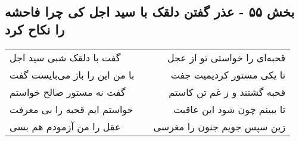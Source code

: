 \begin{center}
\section*{بخش ۵۵ - عذر گفتن دلقک با سید اجل کی چرا  فاحشه را نکاح کرد}
\label{sec:sh055}
\begin{longtable}{l p{0.5cm} r}
گفت با دلقک شبی سید اجل
&&
قحبه‌ای را خواستی تو از عجل
\\
با من این را باز می‌بایست گفت
&&
تا یکی مستور کردیمیت جفت
\\
گفت نه مستور صالح خواستم
&&
قحبه گشتند و ز غم تن کاستم
\\
خواستم ایم قحبه را بی معرفت
&&
تا ببینم چون شود این عاقبت
\\
عقل را من آزمودم هم بسی
&&
زین سپس جویم جنون را مغرسی
\\
\end{longtable}
\end{center}
